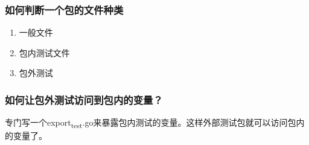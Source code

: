 \hypertarget{ux5982ux4f55ux5224ux65adux4e00ux4e2aux5305ux7684ux6587ux4ef6ux79cdux7c7b}{%
\subsubsection{如何判断一个包的文件种类}\label{ux5982ux4f55ux5224ux65adux4e00ux4e2aux5305ux7684ux6587ux4ef6ux79cdux7c7b}}

\begin{enumerate}
\item
  一般文件

\begin{Shaded}
\begin{Highlighting}[]
\NormalTok{$ }
\NormalTok{[}\NormalTok{ format.go print.go scan.go]}
\end{Highlighting}
\end{Shaded}
\item
  包内测试文件

\begin{Shaded}
\begin{Highlighting}[]
\NormalTok{$ }
\NormalTok{[}\NormalTok{]}
\end{Highlighting}
\end{Shaded}
\item
  包外测试

\begin{Shaded}
\begin{Highlighting}[]
\NormalTok{$ }
\NormalTok{[}\NormalTok{ scan_test.go stringer_test.go]}
\end{Highlighting}
\end{Shaded}
\end{enumerate}

\hypertarget{ux5982ux4f55ux8ba9ux5305ux5916ux6d4bux8bd5ux8bbfux95eeux5230ux5305ux5185ux7684ux53d8ux91cf}{%
\subsubsection{如何让包外测试访问到包内的变量？}\label{ux5982ux4f55ux8ba9ux5305ux5916ux6d4bux8bd5ux8bbfux95eeux5230ux5305ux5185ux7684ux53d8ux91cf}}

专门写一个export\textsubscript{test}.go来暴露包内测试的变量。这样外部测试包就可以访问包内的变量了。

